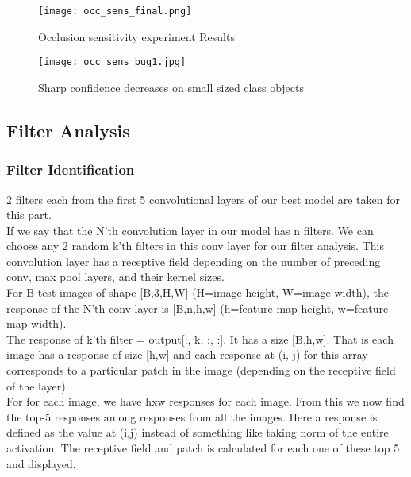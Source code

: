 \documentclass{article}
\begin{document}
\begin{figure}[H]
    \centering
    \texttt{[image: occ\_sens\_final.png]}
    \caption{Occlusion sensitivity experiment Results}
    \label{fig:occ_sens}
\end{figure}

\begin{figure}[H]
    \centering
    \texttt{[image: occ\_sens\_bug1.jpg]}
    \caption{Sharp confidence decreases on small sized class objects}
    \label{fig:occ_sens_s1}
\end{figure}

\subsection{Filter Analysis}

\subsubsection{Filter Identification}
2 filters each from the first 5 convolutional layers of our best model are taken for this part.
\\

\noindent
If we say that the N'th convolution layer in our model has n filters. We can choose any 2 random k'th filters in this conv layer for our filter analysis. This convolution layer has a receptive field depending on the number of preceding conv, max pool layers, and their kernel sizes.
\\

\noindent
For B test images of shape [B,3,H,W] (H=image height, W=image width), the response of the N'th conv layer is [B,n,h,w] (h=feature map height, w=feature map width). 
\\

\noindent
The response of k'th filter = output[:, k, :, :]. It has a size [B,h,w].
That is each image has a response of size [h,w] and each response at (i, j) for this array corresponds to a particular patch in the image (depending on the receptive field of the layer).
\\

\noindent
For for each image, we have hxw responses for each image. From this we now find the top-5 responses among responses from all the images. Here a response is defined as the value at (i,j) instead of something like taking norm of the entire activation. The receptive field and patch is calculated for each one of these top 5 and displayed.
\\
\end{document}
